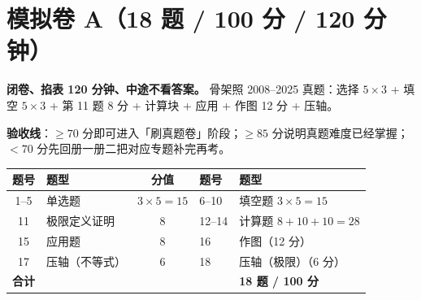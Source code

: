 \newpage
\section{模拟卷 A（18 题 / 100 分 / 120 分钟）}

\begin{keypoint}[用法]
\textbf{闭卷、掐表 120 分钟、中途不看答案。} 骨架照 2008--2025 真题：选择 $5\times3$ + 填空 $5\times3$ + 第 11 题 8 分 + 计算块 + 应用 + 作图 12 分 + 压轴。

\textbf{验收线}：$\geq70$ 分即可进入「刷真题卷」阶段；$\geq85$ 分说明真题难度已经掌握；$<70$ 分先回册一册二把对应专题补完再考。
\end{keypoint}

\begin{center}
\small\setlength{\tabcolsep}{5pt}
\begin{tabularx}{\linewidth}{c l c l X@{}}
\toprule
题号 & 题型 & 分值 & 题号 & 题型\\
\midrule
1--5 & 单选题 & $3\times5=15$ & 6--10 & 填空题 $3\times5=15$\\
11 & 极限定义证明 & 8 & 12--14 & 计算题 $8+10+10=28$\\
15 & 应用题 & 8 & 16 & 作图（12 分）\\
17 & 压轴（不等式） & 6 & 18 & 压轴（极限）（6 分）\\
\midrule
\multicolumn{4}{l}{\textbf{合计}} & \textbf{18 题 / 100 分}\\
\bottomrule
\end{tabularx}
\end{center}

